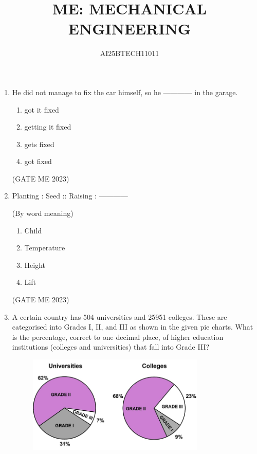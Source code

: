 \documentclass[journal]{IEEEtran}
\begin{document}
\title{
ME: MECHANICAL ENGINEERING}
\author{AI25BTECH11011}
\maketitle
\renewcommand{\thefigure}{\theenumi}
\renewcommand{\thetable}{\theenumi}

\begin{enumerate}

\item He did not manage to fix the car himself, so he ------------ in the garage.

\begin{enumerate}
    \item got it fixed
    \item getting it fixed
    \item gets fixed
    \item got fixed
\end{enumerate}
\hfill (GATE ME 2023)

\item Planting : Seed :: Raising : ------------

(By word meaning)

\begin{enumerate}
    \item Child
    \item Temperature
    \item Height
    \item Lift
\end{enumerate}
\hfill (GATE ME 2023)

\item A certain country has 504 universities and 25951 colleges. These are categorised into Grades I, II, and III as shown in the given pie charts. What is the percentage, correct to one decimal place, of higher education institutions (colleges and universities) that fall into Grade III?

\begin{figure}[H]
    \centering
    \includegraphics[width=0.8\textwidth]{Fig 1.png}
    \caption{}
    \label{fig:question3}
\end{figure}


\end{enumerate}
\end{document}
